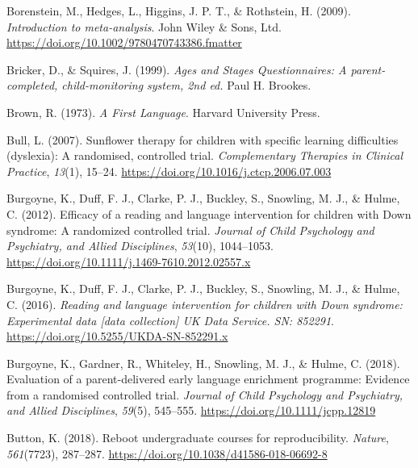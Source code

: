 \documentclass{krantz}
\newlength{\cslhangindent}
\newlength{\cslentryspacingunit} %
\newenvironment{CSLReferences}[2] %
{%
\setlength{\parindent}{0pt}
\ifodd #1
\let\oldpar\par
\def\par{\hangindent=\cslhangindent\oldpar}
\fi
\setlength{\parskip}{#2\cslentryspacingunit}
}%
{}
\begin{document}
\begin{CSLReferences}{1}{0}
\leavevmode{}%
Borenstein, M., Hedges, L., Higgins, J. P. T., \& Rothstein, H. (2009). \emph{Introduction to meta-analysis}. {John Wiley \& Sons, Ltd}. \url{https://doi.org/10.1002/9780470743386.fmatter}

\leavevmode{}%
Bricker, D., \& Squires, J. (1999). \emph{Ages and {Stages Questionnaires}: {A} parent-completed, child-monitoring system, 2nd ed.} {Paul H. Brookes}.

\leavevmode{}%
Brown, R. (1973). \emph{A {First Language}}. {Harvard University Press}.

\leavevmode{}%
Bull, L. (2007). Sunflower therapy for children with specific learning difficulties (dyslexia): A randomised, controlled trial. \emph{Complementary Therapies in Clinical Practice}, \emph{13}(1), 15--24. \url{https://doi.org/10.1016/j.ctcp.2006.07.003}

\leavevmode{}%
Burgoyne, K., Duff, F. J., Clarke, P. J., Buckley, S., Snowling, M. J., \& Hulme, C. (2012). Efficacy of a reading and language intervention for children with {Down} syndrome: A randomized controlled trial. \emph{Journal of Child Psychology and Psychiatry, and Allied Disciplines}, \emph{53}(10), 1044--1053. \url{https://doi.org/10.1111/j.1469-7610.2012.02557.x}

\leavevmode{}%
Burgoyne, K., Duff, F. J., Clarke, P. J., Buckley, S., Snowling, M. J., \& Hulme, C. (2016). \emph{Reading and language intervention for children with {Down} syndrome: {Experimental} data {[}data collection{]} UK Data Service. SN: 852291}. \url{https://doi.org/10.5255/UKDA-SN-852291.x}

\leavevmode{}%
Burgoyne, K., Gardner, R., Whiteley, H., Snowling, M. J., \& Hulme, C. (2018). Evaluation of a parent-delivered early language enrichment programme: Evidence from a randomised controlled trial. \emph{Journal of Child Psychology and Psychiatry, and Allied Disciplines}, \emph{59}(5), 545--555. \url{https://doi.org/10.1111/jcpp.12819}

\leavevmode{}%
Button, K. (2018). Reboot undergraduate courses for reproducibility. \emph{Nature}, \emph{561}(7723), 287--287. \url{https://doi.org/10.1038/d41586-018-06692-8}


\end{CSLReferences}
\end{document}
